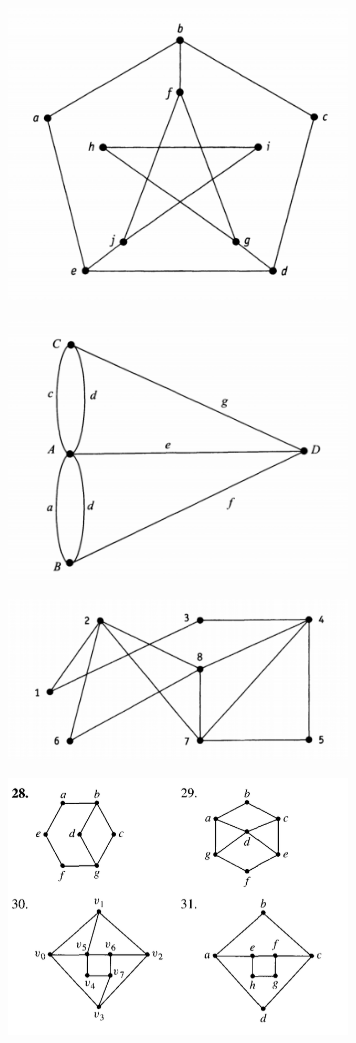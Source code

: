 \documentclass{article}
\begin{document}
\begin{figure}
\centering
\includegraphics[width=90mm]{h1}
\end{figure}

\begin{figure}
\centering
\includegraphics[width=90mm]{h2}
\end{figure}

\begin{figure}
\centering
\includegraphics[width=90mm]{h3}
\end{figure}

\begin{figure}
\centering
\includegraphics[width=90mm]{h4}
\end{figure}
\end{document}
